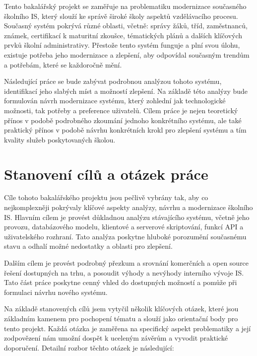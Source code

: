 \documentclass[FM,Proj]{tulthesis}
\begin{document}
Tento bakalářský projekt se zaměřuje na problematiku modernizace současného 
školního IS, který slouží ke správě široké školy aspektů vzdělávacího procesu. 
Současný systém pokrývá různé oblasti, včetně: správy žáků, tříd, zaměstnanců, 
známek, certifikací k maturitní zkoušce, tématických plánů a dalších klíčových 
prvků školní administrativy. Přestože tento systém funguje a plní svou úlohu, 
existuje potřeba jeho modernizace a zlepšení, aby odpovídal současným trendům 
a potřebám, které se každoročně mění.

Následující práce se bude zabývat podrobnou analýzou tohoto systému, 
identifikací jeho slabých míst a možností zlepšení. Na základě této analýzy 
bude formulován návrh modernizace systému, který zohlední jak technologické 
možnosti, tak potřeby a preference uživatelů. Cílem práce je nejen teoretický 
přínos v podobě podrobného zkoumání jednoho konkrétního systému, ale také 
praktický přínos v podobě návrhu konkrétních krokl pro zlepšení systému a 
tím kvality služeb poskytovaných školou.

\section{Stanovení cílů a otázek práce}
Cíle tohoto bakalářského projektu jsou pečlivě vybrány tak, aby co 
nejkomplexněji pokrývaly klíčové aspekty analýzy, návrhu a modernizace školního 
IS. Hlavním cílem je provést důkladnou analýzu stávajícího systému, včetně 
jeho provozu, databázového modelu, klientové a serverové skriptování, funkcí 
API a uživatelského rozhraní. Tato analýza poskytne hluboké porozumění současnému
stavu a odhalí možné nedostatky a oblasti pro zlepšení.

Dalším cílem je provést podrobný přezkum a srovnání komerčních a open source řešení
dostupných na trhu, a posoudit výhody a nevýhody interního vývoje IS. Tato část 
práce poskytne cenný vhled do dostupných možností a pomůže při formulaci 
návrhu nového systému.

Na základě stanovených cílů jsem vytyčil několik klíčových otázek, které 
jsou základním kamenem pro pochopení tématu a slouží jako orientační body pro tento 
projekt. Každá otázka je zaměřena na specifický aspekt problematiky a její 
zodpovězení nám umožní dospět k uceleným závěrům a vyvodit praktické doporučení. 
Detailní rozbor těchto otázek je následující:
\end{document}
